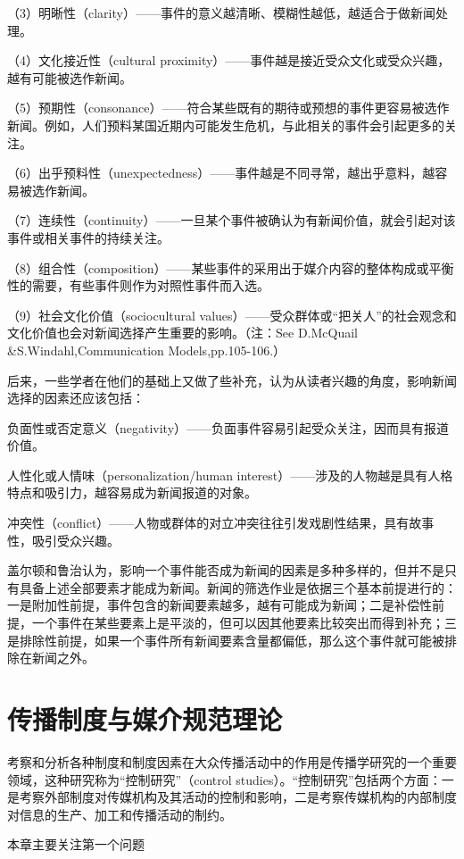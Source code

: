 \documentclass[UTF8,12pt]{ctexart}
\numberwithin{equation}{section} %
\numberwithin{figure}{section}
\numberwithin{table}{section}
\begin{document}
	（3）明晰性（clarity）——事件的意义越清晰、模糊性越低，越适合于做新闻处理。
	
	（4）文化接近性（cultural proximity）——事件越是接近受众文化或受众兴趣，越有可能被选作新闻。
	
	（5）预期性（consonance）——符合某些既有的期待或预想的事件更容易被选作新闻。例如，人们预料某国近期内可能发生危机，与此相关的事件会引起更多的关注。
	
	（6）出乎预料性（unexpectedness）——事件越是不同寻常，越出乎意料，越容易被选作新闻。
	
	（7）连续性（continuity）——一旦某个事件被确认为有新闻价值，就会引起对该事件或相关事件的持续关注。
	
	（8）组合性（composition）——某些事件的采用出于媒介内容的整体构成或平衡性的需要，有些事件则作为对照性事件而入选。
	
	（9）社会文化价值（sociocultural values）——受众群体或“把关人”的社会观念和文化价值也会对新闻选择产生重要的影响。（注：See D.McQuail \&S.Windahl,Communication Models,pp.105-106.）
	
	后来，一些学者在他们的基础上又做了些补充，认为从读者兴趣的角度，影响新闻选择的因素还应该包括：
	
	负面性或否定意义（negativity）——负面事件容易引起受众关注，因而具有报道价值。
	
	人性化或人情味（personalization/human interest）——涉及的人物越是具有人格特点和吸引力，越容易成为新闻报道的对象。
	
	冲突性（conflict）——人物或群体的对立冲突往往引发戏剧性结果，具有故事性，吸引受众兴趣。
	
	盖尔顿和鲁治认为，影响一个事件能否成为新闻的因素是多种多样的，但并不是只有具备上述全部要素才能成为新闻。新闻的筛选作业是依据三个基本前提进行的：一是附加性前提，事件包含的新闻要素越多，越有可能成为新闻；二是补偿性前提，一个事件在某些要素上是平淡的，但可以因其他要素比较突出而得到补充；三是排除性前提，如果一个事件所有新闻要素含量都偏低，那么这个事件就可能被排除在新闻之外。
	
	\section{传播制度与媒介规范理论}
	考察和分析各种制度和制度因素在大众传播活动中的作用是传播学研究的一个重要领域，这种研究称为“控制研究”（control studies）。“控制研究”包括两个方面：一是考察外部制度对传媒机构及其活动的控制和影响，二是考察传媒机构的内部制度对信息的生产、加工和传播活动的制约。
	
	本章主要关注第一个问题
	
\end{document}

